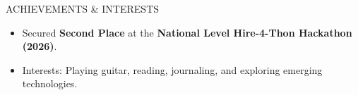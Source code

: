 \documentclass{resume} %
\begin{document}

\begin{rSection}{ACHIEVEMENTS \& INTERESTS}

\begin{itemize}

\item Secured \textbf{Second Place} at the \textbf{National Level Hire-4-Thon Hackathon (2026)}.

\item Interests: Playing guitar, reading, journaling, and exploring emerging technologies.

\end{itemize}

\end{rSection}
\end{document}
